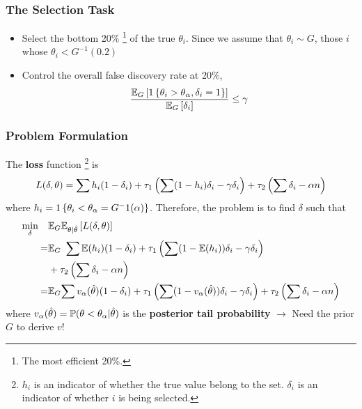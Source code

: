 \documentclass[10pt,mathserif,aspectratio=169]{beamer}
\begin{document}
\begin{frame}
  \frametitle{The Selection Task}
  \begin{itemize}\itemsep=12pt
    \item Select the bottom 20\% \footnote{The most efficient 20\%.} of the true
          $\theta_i$. Since we assume that $\theta_i \sim G$, those $i$ whose
          $\theta_i<G^{-1}(0.2)$
    \item Control the overall false discovery rate at 20\%, \begin{equation*}
            \frac{\mathbb{E}_G\left[1\left\{\theta_i>\theta_{\alpha},\delta_i=1\right\}\right]}{\mathbb{E}_G\left[\delta_i\right]} \le \gamma
          \end{equation*}
  \end{itemize}
\end{frame}

\begin{frame}
  \frametitle{Problem Formulation}
  The \textbf{loss} function \footnote{$h_i$ is an indicator of whether the true value belong to the set. $\delta_i$ is an indicator of whether $i$ is being selected.} is
  \begin{equation*}
    L(\delta,\theta)=\sum h_i(1-\delta_i) +\tau_1\left(\sum (1-h_i)\delta_i -\gamma \delta_i\right) + \tau_2 \left(\sum \delta_i -\alpha n\right)
  \end{equation*} where $h_i=1\left\{\theta_i<\theta_{\alpha}=G^-1(\alpha)\right\}$.
  Therefore, the problem is to find $\delta$ such that
  \begin{align*}
    \min_{\delta} \quad & \mathbb{E}_G\mathbb{E}_{\theta|\hat{\theta}}\left[L(\delta,\theta)\right]                                                                                                       \\
    =                   & \mathbb{E}_G \ \sum \mathbb{E}(h_i)(1-\delta_i) +\tau_1\left(\sum (1-\mathbb{E}(h_i))\delta_i -\gamma \delta_i\right)                                                                    \\
                        & + \tau_2 \left(\sum \delta_i -\alpha n\right)                                                                                                                    \\
    =                   & \mathbb{E}_G{\sum v_\alpha(\hat{\theta})(1-\delta_i) +\tau_1\left(\sum (1-v_\alpha(\hat{\theta}))\delta_i -\gamma \delta_i\right) + \tau_2 \left(\sum \delta_i -\alpha n\right)}
  \end{align*} where $v_\alpha(\hat{\theta})=\mathbb{P}(\theta<\theta_\alpha|\hat{\theta})$ is the \textbf{posterior tail probability} $\to$ Need the prior $G$ to derive $v$!
\end{frame}
\end{document}
